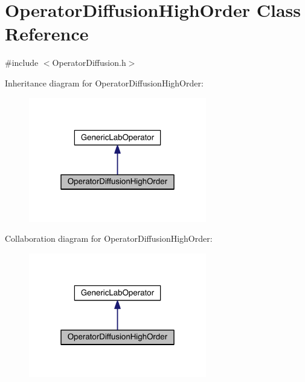 \hypertarget{class_operator_diffusion_high_order}{}\section{Operator\+Diffusion\+High\+Order Class Reference}
\label{class_operator_diffusion_high_order}


{\ttfamily \#include $<$Operator\+Diffusion.\+h$>$}



Inheritance diagram for Operator\+Diffusion\+High\+Order\+:\nopagebreak
\begin{figure}[H]
\begin{center}
\leavevmode
\includegraphics[width=220pt]{df/d6f/class_operator_diffusion_high_order__inherit__graph}
\end{center}
\end{figure}


Collaboration diagram for Operator\+Diffusion\+High\+Order\+:\nopagebreak
\begin{figure}[H]
\begin{center}
\leavevmode
\includegraphics[width=220pt]{dd/db4/class_operator_diffusion_high_order__coll__graph}
\end{center}
\end{figure}
